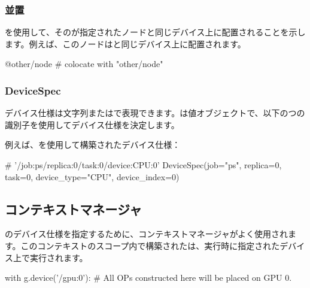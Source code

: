 \begin{content}
\subsubsection{並置}

を使用して、そのが指定されたノードと同じデバイス上に配置されることを示します。例えば、このノードはと同じデバイス上に配置されます。

\begin{leftbar}
\begin{python}
@other/node  # colocate with "other/node"
\end{python}
\end{leftbar}

\subsubsection{DeviceSpec}

デバイス仕様は文字列またはで表現できます。は値オブジェクトで、以下のつの識別子を使用してデバイス仕様を決定します。

\begin{enum}
\end{enum}

例えば、を使用して構築されたデバイス仕様：

\begin{leftbar}
\begin{python}
# '/job:ps/replica:0/task:0/device:CPU:0'
DeviceSpec(job="ps", replica=0, task=0, device_type="CPU", device_index=0)
\end{python}
\end{leftbar}

\subsection{コンテキストマネージャ}

のデバイス仕様を指定するために、コンテキストマネージャがよく使用されます。このコンテキストのスコープ内で構築されたは、実行時に指定されたデバイス上で実行されます。

\begin{leftbar}
\begin{python}
with g.device('/gpu:0'):
  # All OPs constructed here will be placed on GPU 0.
\end{python}
\end{leftbar}


\end{content}
